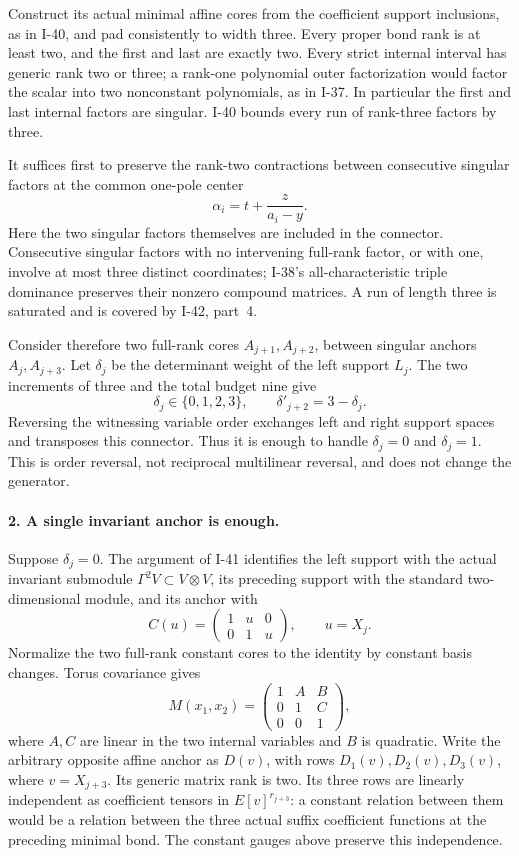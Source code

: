 Construct its actual minimal affine cores from the coefficient
support inclusions, as in I-40, and pad consistently to width
three. Every proper bond rank is at least two, and the first
and last are exactly two. Every strict internal interval has
generic rank two or three; a rank-one polynomial outer
factorization would factor the scalar into two nonconstant
polynomials, as in I-37. In particular the first and last
internal factors are singular. I-40 bounds every run of
rank-three factors by three.

It suffices first to preserve the rank-two contractions
between consecutive singular factors at the common one-pole
center
\[
 \alpha_i=t+\frac{z}{a_i-y}.
 \tag{I.159}
\]
Here the two singular factors themselves are included in the
connector. Consecutive singular factors with no intervening
full-rank factor, or with one, involve at most three distinct
coordinates; I-38's all-characteristic triple dominance
preserves their nonzero compound matrices. A run of length
three is saturated and is covered by I-42, part~4.

Consider therefore two full-rank cores $A_{j+1},A_{j+2}$,
between singular anchors $A_j,A_{j+3}$. Let $\delta_j$ be the
determinant weight of the left support $L_j$. The two increments
of three and the total budget nine give
\[
 \delta_j\in\{0,1,2,3\},\qquad
 \delta'_{j+2}=3-\delta_j.
 \tag{I.160}
\]
Reversing the witnessing variable order exchanges left and
right support spaces and transposes this connector. Thus it
is enough to handle $\delta_j=0$ and $\delta_j=1$. This is
order reversal, not reciprocal multilinear reversal, and
does not change the generator.

\paragraph{2. A single invariant anchor is enough.}
Suppose $\delta_j=0$. The argument of I-41 identifies the
left support with the actual invariant submodule
$\Gamma^2V\subset V\otimes V$, its preceding support with
the standard two-dimensional module, and its anchor with
\[
 C(u)=\begin{pmatrix}1&u&0\\0&1&u\end{pmatrix},
 \qquad u=X_j.
 \tag{I.161}
\]
Normalize the two full-rank constant cores to the identity by
constant basis changes. Torus covariance gives
\[
 M(x_1,x_2)=
 \begin{pmatrix}1&A&B\\0&1&C\\0&0&1\end{pmatrix},
 \tag{I.162}
\]
where $A,C$ are linear in the two internal variables and
$B$ is quadratic. Write the arbitrary opposite affine anchor
as $D(v)$, with rows $D_1(v),D_2(v),D_3(v)$, where
$v=X_{j+3}$. Its generic matrix rank is two. Its three rows
are linearly independent as coefficient tensors in
$E[v]^{r_{j+3}}$: a constant relation between them would be
a relation between the three actual suffix coefficient
functions at the preceding minimal bond. The constant gauges
above preserve this independence.


